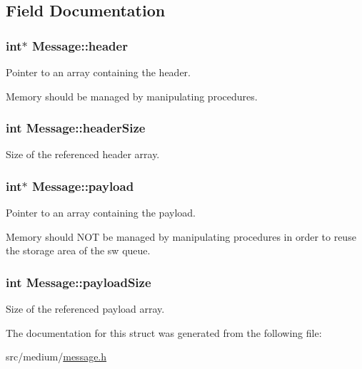 \subsection{Field Documentation}
\hypertarget{structMessage_ac5433672aa52e04391534dcd73bb1286}{
\subsubsection[{header}]{\setlength{\rightskip}{0pt plus 5cm}int$\ast$ Message\-::header}}\label{structMessage_ac5433672aa52e04391534dcd73bb1286}


Pointer to an array containing the header. 

Memory should be managed by manipulating procedures. \hypertarget{structMessage_ac6c78db74f1baf3454acd76d8830489a}{
\subsubsection[{header\-Size}]{\setlength{\rightskip}{0pt plus 5cm}int Message\-::header\-Size}}\label{structMessage_ac6c78db74f1baf3454acd76d8830489a}


Size of the referenced header array. 

\hypertarget{structMessage_a4e4b7d09227526e0999f2ef140606c64}{
\subsubsection[{payload}]{\setlength{\rightskip}{0pt plus 5cm}int$\ast$ Message\-::payload}}\label{structMessage_a4e4b7d09227526e0999f2ef140606c64}


Pointer to an array containing the payload. 

Memory should N\-O\-T be managed by manipulating procedures in order to reuse the storage area of the sw queue. \hypertarget{structMessage_ae17de6f21df9cca8b3fc9baf27f992f8}{
\subsubsection[{payload\-Size}]{\setlength{\rightskip}{0pt plus 5cm}int Message\-::payload\-Size}}\label{structMessage_ae17de6f21df9cca8b3fc9baf27f992f8}


Size of the referenced payload array. 



The documentation for this struct was generated from the following file\-:\begin{DoxyCompactItemize}
\item 
src/medium/\hyperlink{message_8h}{message.\-h}\end{DoxyCompactItemize}
